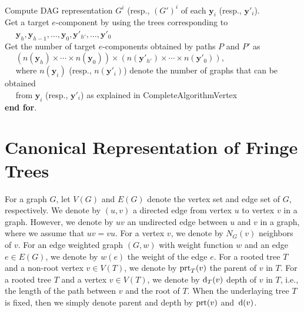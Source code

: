 \documentclass[12pt]{article}
\newcommand{\V}{{\rm V}}
\newcommand{\w}{\pmb{w}}
\newcommand{\y}{\pmb{y}}
\newcommand{\1}{\pmb{1}}
\newcommand{\0}{\pmb{0}}
\newcommand{\inl}{\mathrm{inl}}
\newcommand{\en}{\mathrm{end}}
\begin{document}
\begin{tabbing}
Compute DAG representation $G^i$ (resp., $(G')^{i}$ of each 
$\y_i$ (resp., $\y'_i$). \\
Get a target $e$-component by using the trees corresponding to\\
~~ $\y_h, \y_{h-1}, \ldots, \y_0, \y'_{h'}, \ldots, \y'_{0}$ \\
Get the number of target $e$-components obtained by paths 
$P$ and $P'$ as \\
~~ $(n(\y_h)\times \cdots \times n(\y_0)) \times 
(n(\y'_{h'})\times \cdots \times n(\y'_{0}))$, \\
~~ where 
$n(\y_i)$ (resp., $n(\y'_i)$) denote the number of 
graphs that can be obtained\\
~~ from $\y_i$ (resp., $\y'_i$)
as explained in {\sc CompleteAlgorithmVertex}\- \\
{\bf end for}.

\end{tabbing}

\section {Canonical Representation of Fringe Trees}

For a graph $G$, let $V(G)$ and $E(G)$ denote the vertex set and edge set of $G$, respectively. 
We denote by $(u, v)$ a directed edge from vertex $u$ to vertex $v$ in 
a graph. 
However, we denote by $uv$ an undirected edge between $u$ and $v$ in a graph, where we assume that $uv =vu$. 
For a vertex $v$, we denote by $N_G(v)$ neighbors of $v$. 
For an edge weighted graph $(G, w)$ with weight function $w$ and an edge 
$e \in E(G)$, we denote by $w(e)$ the weight of the edge  $e$. 
For a rooted tree $T$ and a non-root vertex $v \in V(T)$, we denote by ${\rm prt}_T(v)$ the parent of $v$ in $T$. 
For a rooted tree $T$ and a vertex $v \in V(T)$, we denote by ${\rm d}_T(v)$ 
depth of $v$ in $T$, i.e., the length of the path between $v$ and the root of $T$. 
When the underlaying tree $T$ is fixed, then we simply denote parent and 
depth by ${\rm prt}(v)$ and~${\rm d}(v)$. 
 
\end{document}
